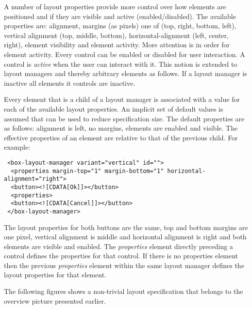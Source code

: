 \documentclass{article}
\begin{document}
   A number of layout properties provide more control over how elements are
   positioned and if they are visible and active (enabled/disabled). The
   available properties are: alignment, margins (as pixels) one of (top, right,
   bottom, left), vertical alignment (top, middle, bottom),
   horizontal-alignment (left, center, right), element visibility and element
   activity.
   More attention is in order for element activity. Every control can be
   enabled or disabled for user interaction. A control is \textit{active} when
   the user can interact with it. This notion is extended to layout managers
   and thereby arbitrary elements as follows. If a layout manager is inactive
   all elements it controls are inactive.
   
   Every element that is a child of a layout manager is associated with a value
   for each of the available layout properties. An implicit set of default
   values is assumed that can be used to reduce specification size.
   The default properties are as follows: alignment is left, no margins,
   elements are enabled and visible. The effective properties of an element are
   relative to that of the previous child. For example:

   \enlargethispage{-\baselineskip}

   \small \begin{verbatim}
 <box-layout-manager variant="vertical" id="">
  <properties margin-top="1" margin-bottom="1" horizontal-alignment="right">
  <button><![CDATA[Ok]]></button>
  <properties>
  <button><![CDATA[Cancel]]></button>
 </box-layout-manager>\end{verbatim}
 \normalsize

   \noindent The layout properties for both buttons are the same, top and bottom margins
   are one pixel, vertical alignment is middle and horizontal alignment is right
   and both elements are visible and enabled. The \textit{properties} element
   directly preceding a control defines the properties for that control. If
   there is no properties element then the previous \textit{properties} element
   within the same layout manager defines the layout properties for that
   element.

   The following figures shows a non-trivial layout specification that belongs
   to the overview picture presented earlier.
\end{document}
